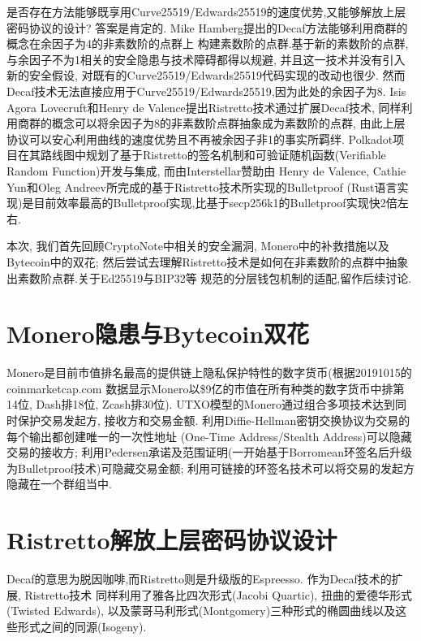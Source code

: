 \documentclass{article}
\begin{document}
是否存在方法能够既享用Curve25519/Edwards25519的速度优势,又能够解放上层密码协议的设计?
答案是肯定的. Mike Hamberg提出的Decaf方法能够利用商群的概念在余因子为4的非素数阶的点群上
构建素数阶的点群.基于新的素数阶的点群,与余因子不为1相关的安全隐患与技术障碍都得以规避,
并且这一技术并没有引入新的安全假设, 对既有的Curve25519/Edwards25519代码实现的改动也很少.
然而Decaf技术无法直接应用于Curve25519/Edwards25519,因为此处的余因子为8.
Isis Agora Lovecruft和Henry de Valence提出Ristretto技术通过扩展Decaf技术,
同样利用商群的概念可以将余因子为8的非素数阶点群抽象成为素数阶的点群, 
由此上层协议可以安心利用曲线的速度优势且不再被余因子非1的事实所羁绊.
Polkadot项目在其路线图中规划了基于Ristretto的签名机制和可验证随机函数(Verifiable Random 
Function)开发与集成, 而由Interstellar赞助由
Henry de Valence, Cathie Yun和Oleg Andreev所完成的基于Ristretto技术所实现的Bulletproof
(Rust语言实现)是目前效率最高的Bulletproof实现,比基于secp256k1的Bulletproof实现快2倍左右.

本次, 我们首先回顾CryptoNote中相关的安全漏洞, Monero中的补救措施以及Bytecoin中的双花;
然后尝试去理解Ristretto技术是如何在非素数阶的点群中抽象出素数阶点群.关于Ed25519与BIP32等
规范的分层钱包机制的适配,留作后续讨论.

\section{Monero隐患与Bytecoin双花}

Monero是目前市值排名最高的提供链上隐私保护特性的数字货币(根据20191015的coinmarketcap.com
数据显示Monero以\$9亿的市值在所有种类的数字货币中排第14位, Dash排18位, Zcash排30位).
UTXO模型的Monero通过组合多项技术达到同时保护交易发起方, 接收方和交易金额. 
利用Diffie-Hellman密钥交换协议为交易的每个输出都创建唯一的一次性地址
(One-Time Address/Stealth Address)可以隐藏交易的接收方; 
利用Pedersen承诺及范围证明(一开始基于Borromean环签名后升级为Bulletproof技术)可隐藏交易金额;
利用可链接的环签名技术可以将交易的发起方
隐藏在一个群组当中.

\section{Ristretto解放上层密码协议设计}

Decaf的意思为脱因咖啡,而Ristretto则是升级版的Espreesso. 作为Decaf技术的扩展, Ristretto技术
同样利用了雅各比四次形式(Jacobi Quartic), 扭曲的爱德华形式(Twisted Edwards),
以及蒙哥马利形式(Montgomery)三种形式的椭圆曲线以及这些形式之间的同源(Isogeny).
\end{document}
